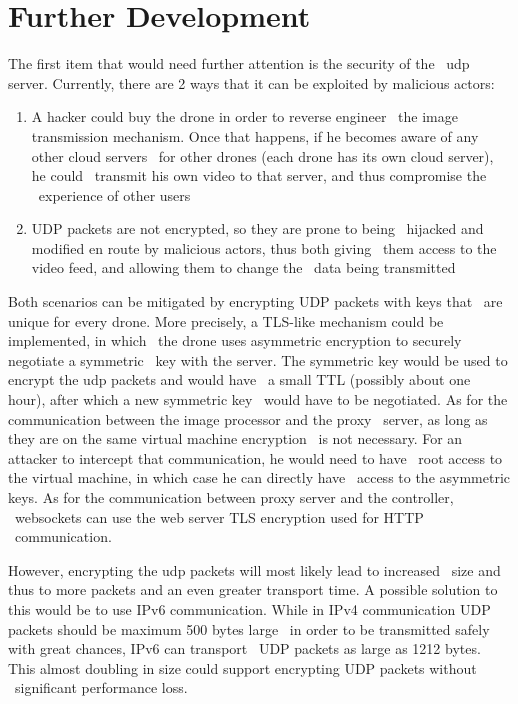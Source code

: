 \section{Further Development}
\label{sec:conclusions-further-development}
The first item that would need further attention is the security of the \
udp server.
Currently, there are 2 ways that it can be exploited by malicious actors:
\begin{enumerate}
    \item A hacker could buy the drone in order to reverse engineer \
        the image transmission mechanism.
        Once that happens, if he becomes aware of any other cloud servers \
        for other drones (each drone has its own cloud server), he could \
        transmit his own video to that server, and thus compromise the \
        experience of other users
    \item UDP packets are not encrypted, so they are prone to being \
        hijacked and modified en route by malicious actors, thus both giving \
        them access to the video feed, and allowing them to change the \
        data being transmitted
\end{enumerate}

Both scenarios can be mitigated by encrypting UDP packets with keys that \
are unique for every drone.
More precisely, a TLS-like mechanism could be implemented, in which \
the drone uses asymmetric encryption to securely negotiate a symmetric \
key with the server.
The symmetric key would be used to encrypt the udp packets and would have \
a small TTL (possibly about one hour), after which a new symmetric key \
would have to be negotiated.
As for the communication between the image processor and the proxy \
server, as long as they are on the same virtual machine encryption \
is not necessary.
For an attacker to intercept that communication, he would need to have \
root access to the virtual machine, in which case he can directly have \
access to the asymmetric keys.
As for the communication between proxy server and the controller, \
websockets can use the web server TLS encryption used for HTTP \
communication.

However, encrypting the udp packets will most likely lead to increased \
size and thus to more packets and an even greater transport time.
A possible solution to this would be to use IPv6 communication.
While in IPv4 communication UDP packets should be maximum 500 bytes large \
in order to be transmitted safely with great chances, IPv6 can transport \
UDP packets as large as 1212 bytes.
This almost doubling in size could support encrypting UDP packets without \
significant performance loss.

